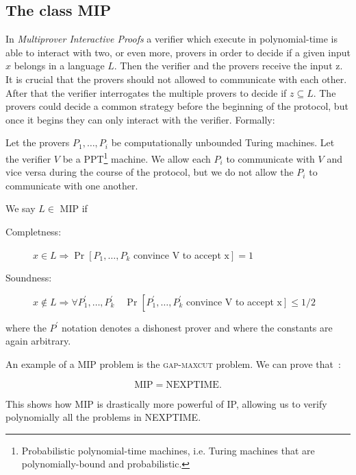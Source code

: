 \subsection{The class MIP}
In \emph{Multiprover Interactive Proofs} a verifier which execute in polynomial-time is able to interact with two, or even more, provers in order to decide if a given input $x$ belongs in a language $L$. Then the verifier and the provers receive the input z. It is crucial that the provers should not allowed to communicate with each other. After that the verifier interrogates the multiple provers to decide if $z \subseteq L$. The provers could decide a common strategy before the beginning of the protocol, but once it begins they can only interact with the verifier. Formally:
\begin{defn}
    Let the provers $P_{1}, \ldots, P_{i}$ be computationally unbounded Turing machines. Let the verifier $V$ be a PPT\footnote{Probabilistic polynomial-time machines, i.e. Turing machines that are polynomially-bound and probabilistic.} machine. We allow each $P_{i}$ to communicate with $V$ and vice versa during the course of the protocol, but we do not allow the $P_{i}$ to communicate with one another. 
    
    We say $L \in$ MIP if 
    \begin{description}
\item[Completness: ]$x \in L \Rightarrow \operatorname{Pr}\left[P_{1}, \ldots, P_{k}\right.$ convince $\mathrm{V}$ to accept $\left.\mathrm{x}\right]=1$
\item[Soundness: ]$x \notin L \Rightarrow \forall P_{1}^{\prime}, \ldots, P_{k}^{\prime} \quad \operatorname{Pr}\left[P_{1}^{\prime}, \ldots, P_{k}^{\prime}\right.$ convince $\mathrm{V}$ to accept $\left.\mathrm{x}\right] \leq 1 / 2$
    \end{description}   
    where the $P^{\prime}$ notation denotes a dishonest prover and where the constants are again arbitrary.
\end{defn}

An example of a MIP problem is the \textsc{gap-maxcut} problem.
We can prove that~\cite{topicsin}:
\begin{theorem}\label{th:mip-nexptime}
    \begin{equation}
\text{MIP}=\text{NEXPTIME}.
    \end{equation}
\end{theorem}

This shows how MIP is drastically more powerful of IP, allowing us to verify polynomially all the problems in NEXPTIME.


